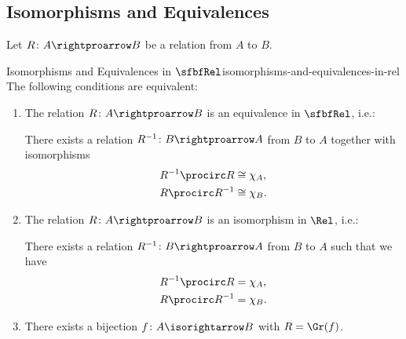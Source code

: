 \subsection{Isomorphisms and Equivalences}\label{subsection-isomorphisms-and-equivalences-in-rel}
Let $R\colon A\rightproarrow B$ be a relation from $A$ to $B$.
\begin{proposition}{Isomorphisms and Equivalences in $\sfbfRel$}{isomorphisms-and-equivalences-in-rel}%
    The following conditions are equivalent:
    \begin{enumerate}
        \item\label{isomorphisms-and-equivalences-in-rel-1}The relation $R\colon A\rightproarrow B$ is an equivalence in $\sfbfRel$, i.e.:
            \begin{itemize}
                \itemstar There exists a relation $R^{-1}\colon B\rightproarrow A$ from $B$ to $A$ together with isomorphisms
                    \begin{align*}
                        R^{-1}\procirc R &\cong \chi_{A},\\
                        R\procirc R^{-1} &\cong \chi_{B}.
                    \end{align*}
            \end{itemize}
        \item\label{isomorphisms-and-equivalences-in-rel-2}The relation $R\colon A\rightproarrow B$ is an isomorphism in $\Rel$, i.e.:
            \begin{itemize}
                \itemstar There exists a relation $R^{-1}\colon B\rightproarrow A$ from $B$ to $A$ such that we have
                    \begin{align*}
                        R^{-1}\procirc R &= \chi_{A},\\
                        R\procirc R^{-1} &= \chi_{B}.
                    \end{align*}
            \end{itemize}
        \item\label{isomorphisms-and-equivalences-in-rel-3}There exists a bijection $f\colon A\isorightarrow B$ with $R=\Gr(f)$.
    \end{enumerate}
\end{proposition}
